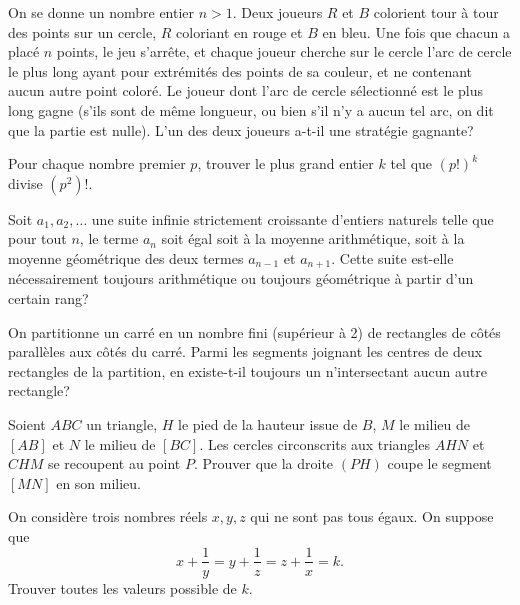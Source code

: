 \begin{exo}{}On se donne un nombre entier $n>1$. Deux joueurs $R$ et $B$ colorient tour à tour des points sur un cercle, $R$ coloriant en rouge et $B$ en bleu. Une fois que chacun a placé $n$ points, le jeu s'arrête, et chaque joueur cherche sur le cercle l'arc de cercle le plus long ayant pour extrémités des points de sa couleur, et ne contenant aucun autre point coloré. Le joueur dont l'arc de cercle sélectionné est le plus long gagne (s'ils sont de même longueur, ou bien s'il n'y a aucun tel arc, on dit que la partie est nulle). L'un des deux joueurs a-t-il une stratégie gagnante?
\end{exo}

\begin{exo}{}Pour chaque nombre premier $p$, trouver le plus grand entier $k$ tel que $(p!)^k$ divise $(p^2)!$.
\end{exo}

\begin{exo}{}Soit $a_1,a_2,\ldots$ une suite infinie strictement croissante d'entiers naturels telle que pour tout $n$, le terme $a_n$ soit égal soit à la moyenne arithmétique, soit à la moyenne géométrique des deux termes $a_{n-1}$ et $a_{n+1}$. Cette suite est-elle nécessairement toujours arithmétique ou toujours géométrique à partir d'un certain rang?
\end{exo}

\begin{exo}{}On partitionne un carré en un nombre fini (supérieur à 2) de rectangles de côtés parallèles aux côtés du carré. Parmi les segments joignant les centres de deux rectangles de la partition, en existe-t-il toujours un n'intersectant aucun autre rectangle?
\end{exo}


\begin{exo}{}Soient $ABC$ un triangle, $H$ le pied de la hauteur issue de $B$, $M$  le milieu de $[AB]$ et $N$ le milieu de $[BC]$. Les cercles circonscrits aux triangles $AHN$ et $CHM$ se recoupent au point $P$. Prouver que la droite $(PH)$ coupe le segment $[MN]$ en son milieu.
\end{exo}

\begin{exo}{}
On considère trois nombres réels $x,y,z$ qui ne sont pas tous égaux. On suppose que 
$$x+ \frac{1}{y}= y+ \frac{1}{z}=z+ \frac{1}{x}=k.$$
Trouver toutes les valeurs possible de $k$.
\end{exo}



